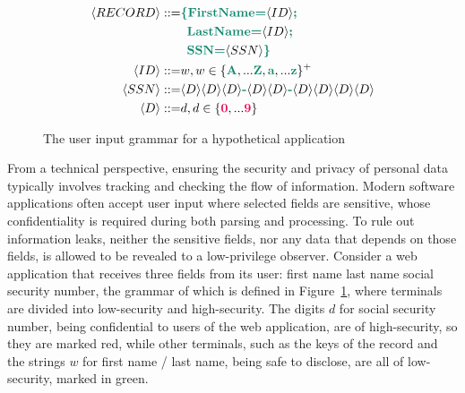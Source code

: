 \begin{figure}[tbp]
  \small
  \begin{align*}
    \langle RECORD \rangle ::= & {\color{green} \textbf{\{FirstName=}} \langle ID \rangle {\color{green} \textbf{;}} \\
                               & \enspace {\color{green} \textbf{LastName=}} \langle ID \rangle {\color{green} \textbf{;}} \\
                               & \enspace {\color{green} \textbf{SSN=}} \langle SSN \rangle {\color{green} \textbf{\}}} \\
    \langle ID \rangle     ::= & w , w \in \{ {\color{green} \textbf{A}}, ... {\color{green} \textbf{Z}}, {\color{green} \textbf{a}}, ... {\color{green} \textbf{z}} \}^{+} \\
    \langle SSN \rangle    ::= & \langle D \rangle \langle D \rangle \langle D \rangle {\color{green} \textbf{-}}
                                 \langle D \rangle \langle D \rangle {\color{green} \textbf{-}}
                                 \langle D \rangle \langle D \rangle \langle D \rangle \langle D \rangle \\
    \langle D \rangle      ::= & d , d \in \{ {\color{red} \textbf{0}}, ... {\color{red} \textbf{9}} \}
  \end{align*}
  \caption{The user input grammar for a hypothetical application}
  \label{fig:grammar}
\end{figure}

From a technical perspective, ensuring the security and privacy of
personal data typically involves tracking and checking
the flow of information.
Modern software applications often accept user input where
selected fields are sensitive, whose confidentiality is required
during both parsing and processing. To rule out information leaks,
neither the sensitive fields, nor any data that depends on those fields,
is allowed to be revealed to a low-privilege observer.
Consider a web application that receives three fields from its user:
 first name  last name 
social security number, the grammar of which
is defined in Figure~\ref{fig:grammar}, where terminals are divided into
low-security and high-security.
The digits $d$ for social security number, being confidential to users of
the web application, are of high-security, so they are marked {\color{red}
  red}, while other terminals, such as the keys of the record and the
strings $w$ for first name / last name, being safe to disclose, are
all of low-security, marked in {\color{green} green}.

